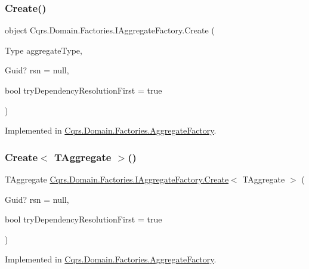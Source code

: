 \subsubsection{\texorpdfstring{Create()}{Create()}}
{\footnotesize\ttfamily object Cqrs.\+Domain.\+Factories.\+I\+Aggregate\+Factory.\+Create (\begin{DoxyParamCaption}\item[{Type}]{aggregate\+Type,  }\item[{Guid?}]{rsn = {\ttfamily null},  }\item[{bool}]{try\+Dependency\+Resolution\+First = {\ttfamily true} }\end{DoxyParamCaption})}



Implemented in \hyperlink{classCqrs_1_1Domain_1_1Factories_1_1AggregateFactory_a917794af09bb3f51629e7abc231f8441}{Cqrs.\+Domain.\+Factories.\+Aggregate\+Factory}.

\mbox{\label{interfaceCqrs_1_1Domain_1_1Factories_1_1IAggregateFactory_a3dcbf8900e0d536da241e2e94f74cdd5}} 
\subsubsection{\texorpdfstring{Create$<$ T\+Aggregate $>$()}{Create< TAggregate >()}}
{\footnotesize\ttfamily T\+Aggregate \hyperlink{interfaceCqrs_1_1Domain_1_1Factories_1_1IAggregateFactory_ade388f0dfa9c42964392159a4f97fb1e}{Cqrs.\+Domain.\+Factories.\+I\+Aggregate\+Factory.\+Create}$<$ T\+Aggregate $>$ (\begin{DoxyParamCaption}\item[{Guid?}]{rsn = {\ttfamily null},  }\item[{bool}]{try\+Dependency\+Resolution\+First = {\ttfamily true} }\end{DoxyParamCaption})}



Implemented in \hyperlink{classCqrs_1_1Domain_1_1Factories_1_1AggregateFactory_ac155d6c1e55ba37bacf420185b652092}{Cqrs.\+Domain.\+Factories.\+Aggregate\+Factory}.

